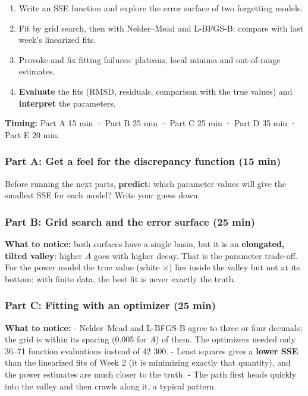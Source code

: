 \begin{enumerate}
\def\labelenumi{\arabic{enumi}.}
\tightlist
\item
  Write an SSE function and explore the error surface of two forgetting
  models.
\item
  Fit by grid search, then with Nelder--Mead and L-BFGS-B; compare with
  last week's linearized fits.
\item
  Provoke and fix fitting failures: plateaus, local minima and
  out-of-range estimates.
\item
  \textbf{Evaluate} the fits (RMSD, residuals, comparison with the true
  values) and \textbf{interpret} the parameters.
\end{enumerate}

\textbf{Timing:} Part A 15 min · Part B 25 min · Part C 25 min · Part D
35 min · Part E 20 min.

\subsubsection{Part A: Get a feel for the discrepancy function (15 min)}

Before running the next parts, \textbf{predict}: which parameter values
will give the smallest SSE for each model? Write your guess down.

\subsubsection{Part B: Grid search and the error surface (25 min)}

\textbf{What to notice:} both surfaces have a single basin, but it is an
\textbf{elongated, tilted valley}: higher \(A\) goes with higher decay.
That is the parameter trade-off. For the power model the true value
(white ×) lies inside the valley but not at its bottom: with finite
data, the best fit is never exactly the truth.

\subsubsection{Part C: Fitting with an optimizer (25 min)}

\textbf{What to notice:} - Nelder--Mead and L-BFGS-B agree to three or
four decimals; the grid is within its spacing (0.005 for \(A\)) of them.
The optimizers needed only 36--71 function evaluations instead of 42
300. - Least squares gives a \textbf{lower SSE} than the linearized fits
of Week 2 (it is minimizing exactly that quantity), and the power
estimates are much closer to the truth. - The path first heads quickly
into the valley and then crawls along it, a typical pattern.

